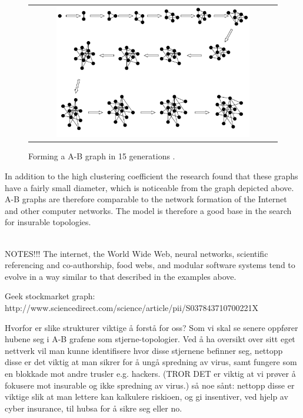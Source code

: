 \begin{figure}[h]
\centering
\begin{tabular}{@{}c@{}}
\includegraphics[width=0.8\textwidth]{../Figures/ABgraphcreation.png}
\end{tabular}
\caption{\label{fig:ABgraphcreation} Forming a A-B graph in 15 generations \cite{audestad}.}
\end{figure}

In addition to the high clustering coefficient the research found that these graphs have a fairly small diameter,
 which is noticeable from the graph depicted above. 
 A-B graphs are therefore comparable to the network formation of the Internet and other computer networks. 
The model is therefore a good base in the search for insurable topologies. 


\\
NOTES!!!
The internet, the World Wide Web, neural networks, scientific referencing and co-authorship, food 
webs, and modular software systems tend to evolve in a way similar to that described in the examples 
above.

Geek stockmarket graph: http://www.sciencedirect.com/science/article/pii/S037843710700221X



Hvorfor er slike strukturer viktige å forstå for oss? 
Som vi skal se senere oppfører hubene seg i A-B grafene som stjerne-topologier. 
Ved å ha oversikt over sitt eget nettverk vil man kunne identifisere hvor disse stjernene befinner seg, nettopp disse er det viktig at man sikrer for å ungå spredning av virus, samt fungere som en blokkade mot andre trusler e.g. hackers. (TROR DET er viktig at vi prøver å fokusere mot insurable og ikke spredning av virus.)
så noe sånt:
nettopp disse er viktige slik at man lettere kan kalkulere riskioen, og gi insentiver, ved hjelp av cyber insurance, til hubsa for å sikre seg eller no.







